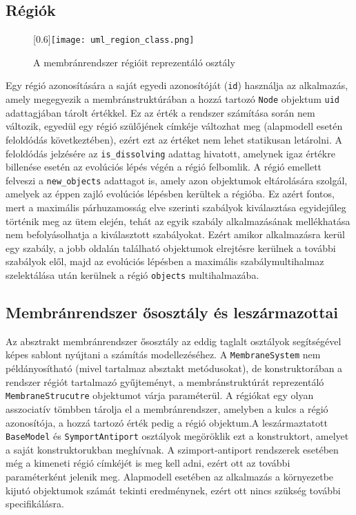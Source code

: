 \subsection{Régiók}

\begin{figure}[H]
\centering
	\scalebox{0.6}[0.6]{\texttt{[image: uml\_region\_class.png]}}
	\caption{A membránrendszer régióit reprezentáló osztály}
	\label{fig:region_uml}
\end{figure}

Egy régió azonosítására a saját egyedi azonosítóját (\verb|id|) használja az alkalmazás, amely megegyezik a membránstruktúrában a hozzá tartozó \verb|Node| objektum \verb|uid| adattagjában tárolt értékkel. Ez az érték a rendszer számítása során nem változik, egyedül egy régió szülőjének címkéje változhat meg (alapmodell esetén feloldódás következtében), ezért ezt az értéket nem lehet statikusan letárolni. A feloldódás jelzésére az \verb|is_dissolving| adattag hivatott, amelynek igaz értékre billenése esetén az evolúciós lépés végén a régió felbomlik. A régió emellett felveszi a \verb|new_objects| adattagot is, amely azon objektumok eltárolására szolgál, amelyek az éppen zajló evolúciós lépésben kerültek a régióba. Ez azért fontos, mert a maximális párhuzamosság elve szerinti szabályok kiválasztása egyidejűleg történik meg az ütem elején, tehát az egyik szabály alkalmazásának mellékhatása nem befolyásolhatja a kiválasztott szabályokat. Ezért amikor alkalmazásra kerül egy szabály, a jobb oldalán található objektumok elrejtésre kerülnek a további szabályok elől, majd az evolúciós lépésben a maximális szabálymultihalmaz szelektálása után kerülnek a régió \verb|objects| multihalmazába. 

\subsection{Membránrendszer ősosztály és leszármazottai}

Az absztrakt membránrendszer ősosztály az eddig taglalt osztályok segítségével képes sablont nyújtani a számítás modellezéséhez. A \verb|MembraneSystem| nem példányosítható (mivel tartalmaz absztakt metódusokat), de konstruktorában a rendszer régiót tartalmazó gyűjteményt, a membránstruktúrát reprezentáló \verb|MembraneStrucutre| objektumot várja paraméterül. A régiókat egy olyan asszociatív tömbben tárolja el a membránrendszer, amelyben a kulcs a régió azonosítója, a hozzá tartozó érték pedig a régió objektum.A leszármaztatott \verb|BaseModel| és \verb|SymportAntiport| osztályok megöröklik ezt a konstruktort, amelyet a saját konstruktorukban meghívnak. A szimport-antiport rendszerek esetében még a kimeneti régió címkéjét is meg kell adni, ezért ott az további paraméterként jelenik meg. Alapmodell esetében az alkalmazás a környezetbe kijutó objektumok számát tekinti eredménynek, ezért ott nincs szükség további specifikálásra. 

